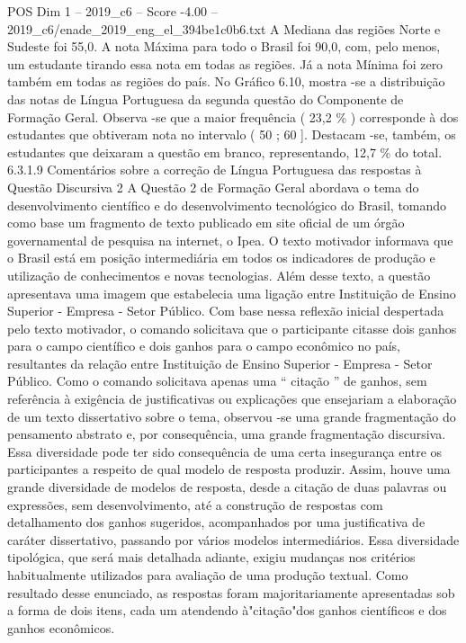 \begin{textsample}{POS Dim 1 – 2019\_c6 – Score -4.00 – 2019\_c6/enade\_2019\_eng\_el\_394be1c0b6.txt}
A Mediana das regiões Norte e Sudeste foi 55,0.
A nota Máxima para todo o Brasil foi 90,0, com, pelo menos, um estudante tirando essa nota em todas as regiões.
Já a nota Mínima foi zero também em todas as regiões do país.
No Gráfico 6.10, mostra -se a distribuição das notas de Língua Portuguesa da segunda questão do Componente de Formação Geral.
Observa -se que a maior frequência ( 23,2 \% ) corresponde à dos estudantes que obtiveram nota no intervalo ( 50 ; 60 ].
Destacam -se, também, os estudantes que deixaram a questão em branco, representando, 12,7 \% do total. 6.3.1.9 Comentários sobre a correção de Língua Portuguesa das respostas à Questão Discursiva 2 A Questão 2 de Formação Geral abordava o tema do desenvolvimento científico e do desenvolvimento tecnológico do Brasil, tomando como base um fragmento de texto publicado em site oficial de um órgão governamental de pesquisa na internet, o Ipea.
O texto motivador informava que o Brasil está em posição intermediária em todos os indicadores de produção e utilização de conhecimentos e novas tecnologias.
Além desse texto, a questão apresentava uma imagem que estabelecia uma ligação entre Instituição de Ensino Superior - Empresa - Setor Público.
Com base nessa reflexão inicial despertada pelo texto motivador, o comando solicitava que o participante citasse dois ganhos para o campo científico e dois ganhos para o campo econômico no país, resultantes da relação entre Instituição de Ensino Superior - Empresa - Setor Público.
Como o comando solicitava apenas uma “ citação ” de ganhos, sem referência à exigência de justificativas ou explicações que ensejariam a elaboração de um texto dissertativo sobre o tema, observou -se uma grande fragmentação do pensamento abstrato e, por consequência, uma grande fragmentação discursiva.
Essa diversidade pode ter sido consequência de uma certa insegurança entre os participantes a respeito de qual modelo de resposta produzir.
Assim, houve uma grande diversidade de modelos de resposta, desde a citação de duas palavras ou expressões, sem desenvolvimento, até a construção de respostas com detalhamento dos ganhos sugeridos, acompanhados por uma justificativa de caráter dissertativo, passando por vários modelos intermediários.
Essa diversidade tipológica, que será mais detalhada adiante, exigiu mudanças nos critérios habitualmente utilizados para avaliação de uma produção textual.
Como resultado desse enunciado, as respostas foram majoritariamente apresentadas sob a forma de dois itens, cada um atendendo à"citação"dos ganhos científicos e dos ganhos econômicos.

\end{textsample}
